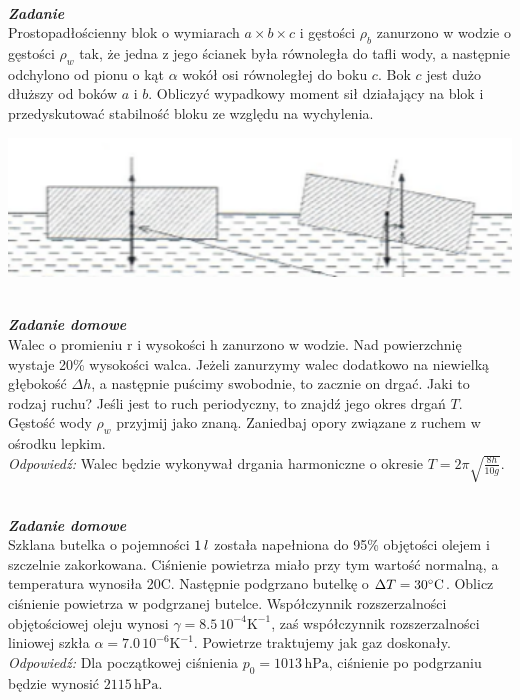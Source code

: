 \documentclass[11pt,a4paper]{article}
\newcounter{zadanie}\newcommand{\zadanie}[1][]{\addtocounter{zadanie}{1} ~\\  {\bf \emph{Zadanie \arabic{zadanie} #1 }} \\}
\newcounter{zaddom}\newcommand{\zaddom}[1][]{\addtocounter{zaddom}{1} ~\\  {\bf \emph{Zadanie domowe \arabic{zaddom} #1 }} \\}
\begin{document}
\begin{minipage}{0.65\textwidth}
    \zadanie
    Prostopadłościenny blok o wymiarach $a\times b\times c$ i gęstości $\rho_b$ zanurzono w wodzie o gęstości $\rho_w$ tak, 
    że jedna z jego ścianek była równoległa do tafli wody, a następnie odchylono od pionu o kąt $\alpha$ wokół osi równoległej
    do boku $c$. Bok $c$ jest dużo dłuższy od boków $a$ i $b$. Obliczyć wypadkowy moment 
    sił działający na blok i przedyskutować stabilność bloku ze względu na wychylenia. 
    \end{minipage}
    \begin{minipage}{0.35\textwidth}
    \begin{center}
    \includegraphics[width=1.0\textwidth]{plywanie3.png}
    \end{center}
\end{minipage}


\newpage

\zaddom
Walec o promieniu r i wysokości h zanurzono w wodzie. Nad powierzchnię wystaje 20\% wysokości walca. Jeżeli zanurzymy walec dodatkowo na niewielką głębokość $\Delta h$, a następnie puścimy swobodnie, to zacznie on drgać. Jaki to rodzaj ruchu? Jeśli jest to ruch periodyczny, to znajdź jego okres drgań $T$. Gęstość wody $\rho_w$ przyjmij jako znaną. Zaniedbaj opory związane z ruchem w ośrodku lepkim.\\
{\em Odpowiedź:} Walec będzie wykonywał drgania harmoniczne o okresie $T = 2\pi \sqrt{\frac{8h}{10g}}$.

\zaddom
Szklana butelka o pojemności $1\textrm\,{l}$ została napełniona do 95\% objętości olejem i szczelnie zakorkowana. Ciśnienie powietrza miało przy tym wartość normalną, a temperatura wynosiła 20\degree C. Następnie podgrzano butelkę o $\Delta T = 30\degree\textrm{C}$. Oblicz ciśnienie powietrza w podgrzanej butelce. Współczynnik rozszerzalności objętościowej oleju wynosi $\gamma = 8.5\,10^{-4} \textrm{K}^{-1}$, zaś współczynnik rozszerzalności liniowej szkła $\alpha  = 7.0\,10^{-6} \textrm{K}^{-1}$. Powietrze traktujemy jak gaz doskonały.\\
{\em Odpowiedź:} Dla początkowej ciśnienia $p_0 = 1013\,\textrm{hPa}$, ciśnienie po podgrzaniu będzie wynosić $2115\,\textrm{hPa}$.
\end{document}
